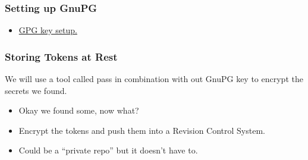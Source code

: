 \documentclass[aspectratio=169]{beamer}
\begin{document}
{
    \begin{frame}
        \frametitle{Setting up GnuPG}
	\begin{itemize}
    	\item \href{https://docs.github.com/en/authentication/managing-commit-signature-verification/generating-a-new-gpg-key}{GPG key setup.}
    \end{itemize}
    \end{frame}
}

{
    \begin{frame}
	   \frametitle{Storing Tokens at Rest}
        We will use a tool called pass in combination with out GnuPG key to encrypt the secrets we found.
        \begin{itemize}
            \item Okay we found some, now what?
		    \item Encrypt the tokens and push them into a Revision Control System.
            \item Could be a ``private repo'' but it doesn't have to.
	   \end{itemize}
    \end{frame}
}
\end{document}
